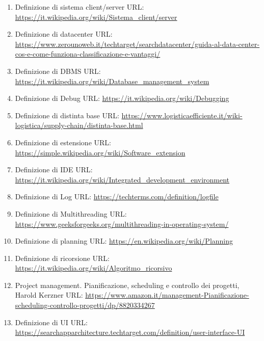 \begin{enumerate}
    \item \label{client/server} Definizione di sistema client/server URL: \url{https://it.wikipedia.org/wiki/Sistema_client/server}

    \item \label{datacenter} Definizione di datacenter URL: \url{https://www.zerounoweb.it/techtarget/searchdatacenter/guida-al-data-center-cos-e-come-funziona-classificazione-e-vantaggi/}
    
    \item \label{dbms} Definizione di DBMS URL: \url{https://it.wikipedia.org/wiki/Database_management_system}
    
    \item \label{debug} Definizione di Debug URL: \url{https://it.wikipedia.org/wiki/Debugging}
    
    \item \label{distinta-base} Definizione di distinta base URL: \url{https://www.logisticaefficiente.it/wiki-logistica/supply-chain/distinta-base.html}
    
    \item \label{estensione} Definizione di estensione URL: \url{https://simple.wikipedia.org/wiki/Software_extension}

    \item \label{ide} Definizione di IDE URL: \url{https://it.wikipedia.org/wiki/Integrated_development_environment}
    
    \item \label{log} Definizione di Log URL: \url{https://techterms.com/definition/logfile}

    \item \label{multithread} Definizione di Multithreading URL: \url{https://www.geeksforgeeks.org/multithreading-in-operating-system/}
    
    \item \label{planning} Definizione di planning URL: \url{https://en.wikipedia.org/wiki/Planning}
    
    \item \label{ricorsione} Definizione di ricorsione URL: \url{https://it.wikipedia.org/wiki/Algoritmo_ricorsivo}
    
    \item \label{scheduling2} Project management. Pianificazione, scheduling e controllo dei progetti, Harold Kerzner URL: \url{https://www.amazon.it/management-Pianificazione-scheduling-controllo-progetti/dp/8820334267}
    
    \item \label{UI} Definizione di UI URL: \url{https://searchapparchitecture.techtarget.com/definition/user-interface-UI}
\end{enumerate}